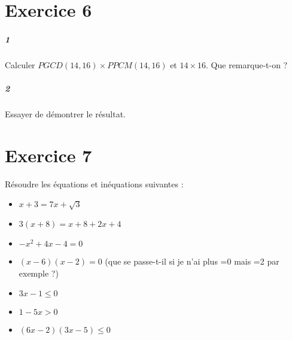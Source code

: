 \documentclass[10pt,a4paper]{article}
\begin{document}
\section{Exercice 6}
\subparagraph{1}Calculer $PGCD(14,16) \times PPCM(14,16)$ et $14 \times 16$. Que remarque-t-on ?
\subparagraph{2}Essayer de démontrer le résultat.
\section{Exercice 7}
Résoudre les équations et inéquations suivantes :
\begin{itemize}
\item $x+3=7x+\sqrt{3}$ 
\item $3(x+8)=x+8+2x+4$
\item $-x^2+4x-4=0$
\item $(x-6)(x-2)=0$ (que se passe-t-il si je n'ai plus =0 mais =2 par exemple ?)
\item $3x-1 \le 0$
\item $1-5x >0$
\item $(6x-2)(3x-5) \le 0$
\end{itemize}
\end{document}
